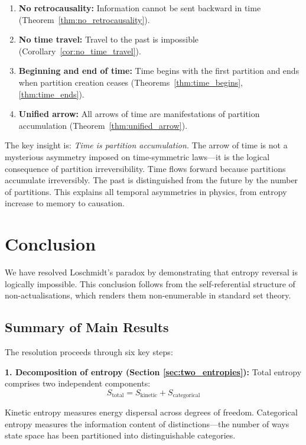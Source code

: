 \documentclass[twocolumn,10pt]{article}
\theoremstyle{definition}
\theoremstyle{remark}
\begin{document}
\begin{enumerate}
\item \textbf{No retrocausality:} Information cannot be sent backward in time (Theorem~\ref{thm:no_retrocausality}).

\item \textbf{No time travel:} Travel to the past is impossible (Corollary~\ref{cor:no_time_travel}).

\item \textbf{Beginning and end of time:} Time begins with the first partition and ends when partition creation ceases (Theorems~\ref{thm:time_begins}, \ref{thm:time_ends}).

\item \textbf{Unified arrow:} All arrows of time are manifestations of partition accumulation (Theorem~\ref{thm:unified_arrow}).
\end{enumerate}

\noindent The key insight is: \textit{Time is partition accumulation.} The arrow of time is not a mysterious asymmetry imposed on time-symmetric laws—it is the logical consequence of partition irreversibility. Time flows forward because partitions accumulate irreversibly. The past is distinguished from the future by the number of partitions. This explains all temporal asymmetries in physics, from entropy increase to memory to causation.


\section{Conclusion}
\label{sec:conclusion}

We have resolved Loschmidt's paradox by demonstrating that entropy reversal is logically impossible. This conclusion follows from the self-referential structure of non-actualisations, which renders them non-enumerable in standard set theory.

\subsection{Summary of Main Results}

The resolution proceeds through six key steps:

\textbf{1. Decomposition of entropy (Section \ref{sec:two_entropies}):} Total entropy comprises two independent components:
$$
S_{\text{total}} = S_{\text{kinetic}} + S_{\text{categorical}}
$$

Kinetic entropy measures energy dispersal across degrees of freedom. Categorical entropy measures the information content of distinctions—the number of ways state space has been partitioned into distinguishable categories.
\end{document}

